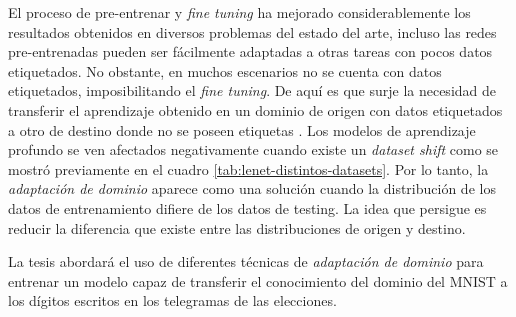 El proceso de pre-entrenar y {\it fine tuning} ha mejorado considerablemente los resultados obtenidos en diversos
problemas del estado del arte, incluso las redes pre-entrenadas pueden ser f\'acilmente adaptadas a otras tareas con
pocos datos etiquetados. No obstante, en muchos escenarios no se cuenta con datos etiquetados, imposibilitando el {\it
        fine tuning}. De aqu\'i es que surje la necesidad de transferir el aprendizaje obtenido en un dominio de origen con
datos etiquetados a otro de destino donde no se poseen etiquetas \parencite{ben2006analysis}. Los modelos de aprendizaje profundo se ven afectados negativamente cuando existe un {\it
        dataset shift} como se mostr\'o previamente en el cuadro \ref{tab:lenet-distintos-datasets}. Por lo tanto, la {\it
        adaptaci\'on de dominio} aparece como una soluci\'on cuando la distribuci\'on de los datos de entrenamiento difiere de
los datos de testing. La idea que persigue es reducir la diferencia que existe entre las distribuciones de origen y
destino.

La tesis abordar\'a el uso de diferentes t\'ecnicas de {\it adaptaci\'on de dominio} para entrenar un modelo capaz de
transferir el conocimiento del dominio del MNIST a los d\'igitos escritos en los telegramas de las elecciones.
